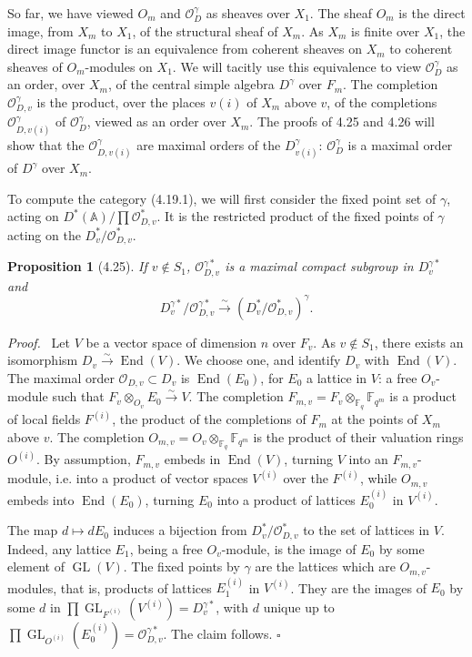 \documentclass[10pt]{article}
\newcommand{\Fq}{\mathbb F_q}
\newcommand{\Fqm}{\mathbb F_{q^m}}
\newcommand{\Adele}{\mathbb A}
\newcommand{\GL}{\operatorname{GL}}
\newcommand{\End}{\operatorname{End}}
\newcommand{\OD}{\mathcal O_D}
\theoremstyle{deligne}
\newtheorem*{proposition*}{Proposition}
\newenvironment{proofdel}[1][Proof.]{\textit{#1}\ }{\hfill$\square$}
\begin{document}
So far, we have viewed $O_m$ and $\OD^\gamma$ as sheaves over $X_1$. The sheaf $O_m$ is the direct image, from $X_m$ to $X_1$, of the structural sheaf of $X_m$. As $X_m$ is finite over $X_1$, the direct image functor is an equivalence from coherent sheaves on $X_m$ to coherent sheaves of $O_m$-modules on $X_1$. We will tacitly use this equivalence to view $\OD^\gamma$ as an order, over $X_m$, of the central simple algebra $D^\gamma$ over $F_m$. The completion $\mathcal O_{D,v}^{\gamma}$ is the product, over the places $v(i)$ of $X_m$ above $v$, of the completions $\mathcal O_{D,v(i)}^{\gamma}$ of $\OD^\gamma$, viewed as an order over $X_m$. The proofs of 4.25 and 4.26 will show that the $\mathcal O_{D,v(i)}^{\gamma}$ are maximal orders of the $D^\gamma_{v(i)}$: $\OD^\gamma$ is a maximal order of $D^\gamma$ over $X_m$.

To compute the category (4.19.1), we will first consider the fixed point set of $\gamma$, acting on $D^*(\Adele)/\prod\mathcal O_{D,v}^*$. It is the restricted product of the fixed points of $\gamma$ acting on the $D_v^*/\mathcal O_{D,v}^*$.

\begin{proposition*}[4.25]
If $v\notin S_1$, $\mathcal O_{D,v}^{\gamma *}$ is a maximal compact subgroup in $D_v^{\gamma *}$ and
\[
D_v^{\gamma *}/\mathcal O_{D,v}^{\gamma *}\xrightarrow{\sim}(D_v^*/\mathcal O_{D,v}^*)^\gamma.
\]
\end{proposition*}

\begin{proofdel}
Let $V$ be a vector space of dimension $n$ over $F_v$. As $v\notin S_1$, there exists an isomorphism $D_v\xrightarrow{\sim}\End(V)$. We choose one, and identify $D_v$ with $\End(V)$. The maximal order $\mathcal O_{D,v}\subset D_v$ is $\End(E_0)$, for $E_0$ a lattice in $V$: a free $O_v$-module such that $F_v\otimes_{O_v}E_0\xrightarrow{\sim}V$. The completion $F_{m,v}=F_v\otimes_{\Fq}\Fqm$ is a product of local fields $F^{(i)}$, the product of the completions of $F_m$ at the points of $X_m$ above $v$. The completion $O_{m,v}=O_v\otimes_{\Fq}\Fqm$ is the product of their valuation rings $O^{(i)}$. By assumption, $F_{m,v}$ embeds in $\End(V)$, turning $V$ into an $F_{m,v}$-module, i.e. into a product of vector spaces $V^{(i)}$ over the $F^{(i)}$, while $O_{m,v}$ embeds into $\End(E_0)$, turning $E_0$ into a product of lattices $E_0^{(i)}$ in $V^{(i)}$.

The map $d\mapsto dE_0$ induces a bijection from $D_v^*/\mathcal O_{D,v}^*$ to the set of lattices in $V$. Indeed, any lattice $E_1$, being a free $O_v$-module, is the image of $E_0$ by some element of $\GL(V)$. The fixed points by $\gamma$ are the lattices which are $O_{m,v}$-modules, that is, products of lattices $E_1^{(i)}$ in $V^{(i)}$. They are the images of $E_0$ by some $d$ in $\prod \GL_{F^{(i)}}(V^{(i)})=D_v^{\gamma *}$, with $d$ unique up to $\prod \GL_{O^{(i)}}(E_0^{(i)})=\mathcal O_{D,v}^{\gamma *}$. The claim follows.
\end{proofdel}
\end{document}
